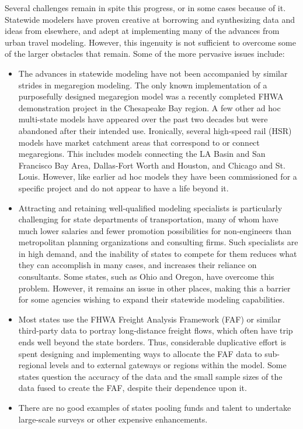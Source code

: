 Several challenges remain in spite this progress, or in some cases because of it. Statewide modelers have proven creative at borrowing and synthesizing data and ideas from elsewhere, and adept at implementing many of the advances from urban travel modeling. However, this ingenuity is not sufficient to overcome some of the larger obstacles that remain. Some of the more pervasive issues include:
\begin{itemize}
\item The advances in statewide modeling have not been accompanied by similar strides in megaregion modeling. The only known implementation of a purposefully designed megaregion model was a recently completed FHWA demonstration project in the Chesapeake Bay region. A few other ad hoc multi-state models have appeared over the past two decades but were abandoned after their intended use. Ironically, several high-speed rail (HSR) models have market catchment areas that correspond to or connect megaregions. This includes models connecting the LA Basin and San Francisco Bay Area, Dallas-Fort Worth and Houston, and Chicago and St. Louis. However, like earlier ad hoc models they have been commissioned for a specific project and do not appear to have a life beyond it.
\item Attracting and retaining well-qualified modeling specialists is particularly challenging for state departments of transportation, many of whom have much lower salaries and fewer promotion possibilities for non-engineers than metropolitan planning organizations and consulting firms. Such specialists are in high demand, and the inability of states to compete for them reduces what they can accomplish in many cases, and increases their reliance on consultants. Some states, such as Ohio and Oregon, have overcome this problem. However, it remains an issue in other places, making this a barrier for some agencies wishing to expand their statewide modeling capabilities.
\item Most states use the FHWA Freight Analysis Framework (FAF) or similar third-party data to portray long-distance freight flows, which often have trip ends well beyond the state borders. Thus, considerable duplicative effort is spent designing and implementing ways to allocate the FAF data to sub-regional levels and to external gateways or regions within the model. Some states question the accuracy of the data and the small sample sizes of the data fused to create the FAF, despite their dependence upon it.
\item There are no good examples of states pooling funds and talent to undertake large-scale surveys or other expensive enhancements.
\end{itemize}

